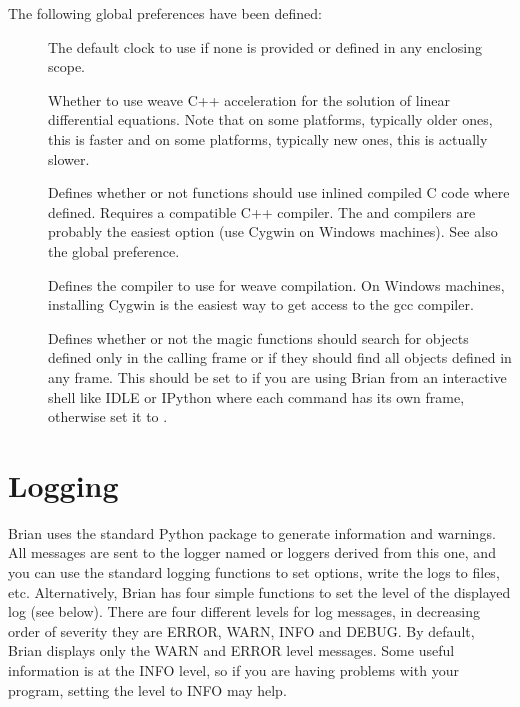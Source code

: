 \documentclass[letterpaper,10pt]{manual}
\begin{document}
The following global preferences have been defined:
\begin{description}
\item[]
The default clock to use if none is provided or defined
in any enclosing scope.

\item[]
Whether to use weave C++ acceleration for the solution
of linear differential equations. Note that on some
platforms, typically older ones, this is faster and on
some platforms, typically new ones, this is actually
slower.

\item[]
Defines whether or not functions should use inlined compiled
C code where defined. Requires a compatible C++ compiler.
The  and  compilers are probably the easiest
option (use Cygwin on Windows machines). See also the
 global preference.

\item[]
Defines the compiler to use for weave compilation. On Windows machines, installing
Cygwin is the easiest way to get access to the gcc compiler.

\item[]
Defines whether or not the magic functions should search
for objects defined only in the calling frame or if they
should find all objects defined in any frame. This should
be set to  if you are using Brian from an interactive
shell like IDLE or IPython where each command has its own
frame, otherwise set it to .

\end{description}

\resetcurrentobjects
{}

\hypertarget{index-71}{}\section{Logging}

Brian uses the standard Python  package to generate information
and warnings. All messages are sent to the logger named  or loggers
derived from this one, and you can use the standard logging functions to
set options, write the logs to files, etc. Alternatively, Brian has four
simple functions to set the level of the displayed log (see below). There
are four different levels for log messages, in decreasing order of severity
they are ERROR, WARN, INFO and DEBUG. By default, Brian displays only the
WARN and ERROR level messages. Some useful information is at the INFO level,
so if you are having problems with your program, setting the level to INFO
may help.
\end{document}
